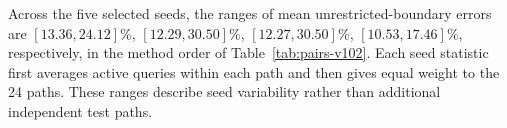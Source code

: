 Across the five selected seeds, the ranges of mean unrestricted-boundary errors are $[13.36,24.12]\%$, $[12.29,30.50]\%$, $[12.27,30.50]\%$, $[10.53,17.46]\%$, respectively, in the method order of Table~\ref{tab:pairs-v102}. Each seed statistic first averages active queries within each path and then gives equal weight to the 24 paths. These ranges describe seed variability rather than additional independent test paths.
